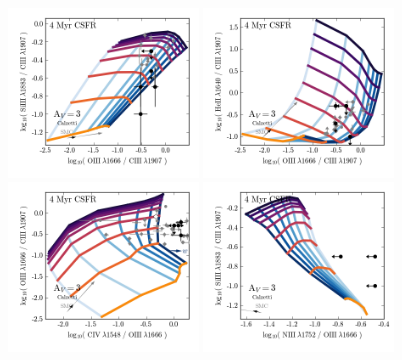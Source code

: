 \documentclass[preprint2]{aastex61}
\begin{document}
\begin{figure}
  \begin{center}
    \includegraphics[width=0.45\textwidth]{figs/f20a.png}
    \includegraphics[width=0.45\textwidth]{figs/f20b.png}\\
    \includegraphics[width=0.45\textwidth]{figs/f20c.png}
    \includegraphics[width=0.45\textwidth]{figs/f20d.png}

\end{center}
\end{figure}
\end{document}
